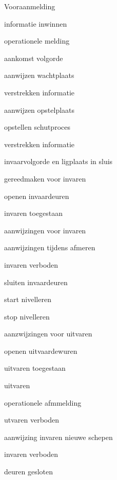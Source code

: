 \begin{itemize}
	\begin{minipage}{0.4\linewidth}
		\item Vooraanmelding
		\item informatie inwinnen
		\item operationele melding
		\item aankomst volgorde
		\item aanwijzen wachtplaats
		\item verstrekken informatie
		\item aanwijzen opstelplaats
		\item opstellen schutproces
		\item verstrekken informatie
		\item invaarvolgorde en ligplaats in sluis
		
	\end{minipage}
	\begin{minipage}{0.4\linewidth}
		
		\item gereedmaken voor invaren
		\item openen invaardeuren
		\item invaren toegestaan
		\item aanwijzingen voor invaren
		\item aanwijzingen tijdens afmeren
		\item invaren verboden
		\item sluiten invaardeuren
		\item start nivelleren
		\item stop nivelleren
		\item aanzwijzingen voor uitvaren
		\item openen uitvaardewuren
		\item uitvaren toegestaan
		
	\end{minipage}
	\begin{minipage}{0.4\linewidth}
		\item uitvaren
		\item operationele afmmelding
		\item utvaren verboden
		\item aanwijzing invaren nieuwe schepen
		\item invaren verboden
		\item deuren gesloten
	\end{minipage}
\end{itemize}




